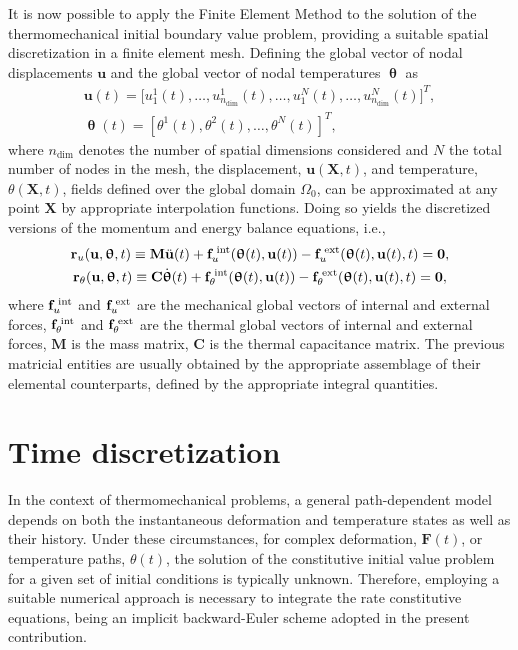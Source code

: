 It is now possible to apply the Finite Element Method to the solution of the thermomechanical initial boundary value problem, providing a suitable spatial discretization in a finite element mesh.
Defining the global vector of nodal displacements \(\mathbf{u}\) and the global vector of nodal temperatures \(\bm{\uptheta}\) as
\begin{gather}
  \mathbf{u}(t) = \Big[ u_1^1(t),\dots,u^1_{n_\text{dim}}(t),\dots, u_1^{N}(t),\dots,u^{N}_{n_\text{dim}}(t)\Big]^T,\\
  \bm{\uptheta}(t) = \left[ \theta^1(t), \theta^2(t), \dots, \theta^{N}(t)\right]^T,
\end{gather}
where \(n_\text{dim}\) denotes the number of spatial dimensions considered and \(N\) the total number of nodes in the mesh, the displacement, $\bm{u}(\bm{X}, t)$, and temperature, \(\theta(\bm{X}, t)\), fields defined over the global domain $\Omega_0$, can be approximated at any point $\bm{X}$ by appropriate interpolation functions.
Doing so yields the discretized versions of the momentum and energy balance equations, i.e.,
\begin{gather}
  \mathbf{r}_{u}(\mathbf{u}, \bm{\uptheta}, t)\equiv\mathbf{M} \ddot{\mathbf{u}}(t) +\mathbf{f}_u^\text{\;int}(\bm{\uptheta}(t), \mathbf{u}(t))-\mathbf{f}^\text{\;ext}_{u}(\bm{\uptheta}(t), \mathbf{u}(t), t)=\mathbf{0}, \label{eq:disc_momentum_balance} \\
  \mathbf{r}_{\theta}(\mathbf{u}, \bm{\uptheta}, t)\equiv \mathbf{C} \dot{\bm{\uptheta}}(t)  + \mathbf{f}_\theta^\text{\;int}(\bm{\uptheta}(t), \mathbf{u}(t))-\mathbf{f}^\text{\;ext}_{\theta}(\bm{\uptheta}(t), \mathbf{u}(t), t)=\mathbf{0}, \label{eq:disc_energy_balance}
\end{gather}
where $\mathbf{f}_u^\text{\;int}$ and $\mathbf{f}^\text{\;ext}_{u}$ are the mechanical global vectors of internal and external forces, $\mathbf{f}_\theta^\text{\;int}$ and $\mathbf{f}^\text{\;ext}_{\theta}$ are the thermal global vectors of internal and external forces, $\mathbf{M}$ is the mass matrix, \(\mathbf{C}\) is the thermal capacitance matrix.
The previous matricial entities are usually obtained by the appropriate assemblage of their elemental counterparts, defined by the appropriate integral quantities.

\section{Time discretization}

In the context of thermomechanical problems, a general path-dependent model depends on both the instantaneous deformation and temperature states as well as their history.
Under these circumstances, for complex deformation, $\bm{F}(t)$, or temperature paths, $\theta(t)$, the solution of the constitutive initial value problem for a given set of initial conditions is typically unknown.
Therefore, employing a suitable numerical approach is necessary to integrate the rate constitutive equations, being an implicit backward-Euler scheme adopted in the present contribution.

